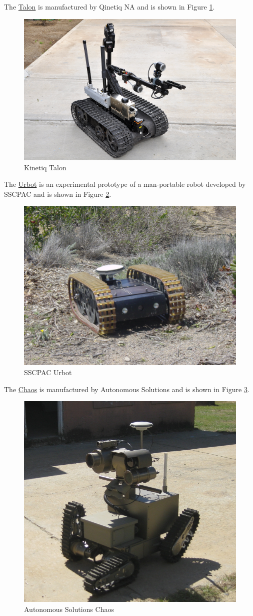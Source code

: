 The \href{http://www.foster-miller.com/lemming.htm}{Talon} is manufactured by Qinetiq NA and is shown in Figure \ref{fig:talon}.

\begin{figure}[ht!]
	\centering
	\includegraphics[width=.3\textwidth]{images/talonRetrotraverse}
	\caption{Kinetiq Talon}
	\label{fig:talon}
\end{figure}

The \href{http://www.spawar.navy.mil/robots/land/mprs/mprs.html}{Urbot} is an experimental prototype of a man-portable robot developed by SSCPAC and is shown in Figure \ref{fig:urbot}.

\begin{figure}[ht!]
	\centering
	\includegraphics[width=.3\textwidth]{images/urbotWithGps}
	\caption{SSCPAC Urbot}
	\label{fig:urbot}
\end{figure}

The \href{http://www.autonomoussolutions.com/products/chaos.php}{Chaos} is manufactured by Autonomous Solutions and is shown in Figure \ref{fig:chaos}.

\begin{figure}[ht!]
	\centering
	\includegraphics[width=.3\textwidth]{images/chaos}
	\caption{Autonomous Solutions Chaos}
	\label{fig:chaos}
\end{figure}

